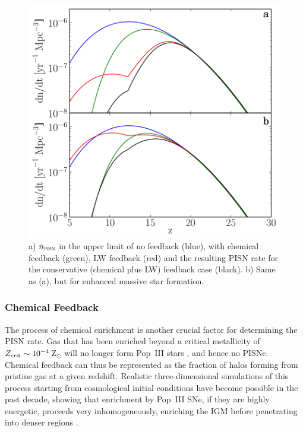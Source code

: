 \documentclass{thesis}
\newcommand{\zsun}{\ensuremath{\,\mathrm{Z}_{\odot}}\xspace}
\begin{document}
\begin{figure}
 \begin{center}
   \includegraphics[width=\columnwidth]{feedbackRate}
   \caption{a) $\dot{n}_{\textsc{pisn}}$ in the upper limit of no
     feedback (blue), with chemical feedback (green), LW feedback
     (red) and the resulting PISN rate for the conservative (chemical
     plus LW) feedback case (black).  b) Same as (a), but for enhanced
     massive star formation.}
   \label{fbrate}
 \end{center}
\end{figure}


\subsubsection{Chemical Feedback}
The process of chemical enrichment is another crucial factor for
determining the PISN rate.  Gas that has been enriched beyond a
critical metallicity of $Z_{\rm crit} \sim 10^{-4}$\zsun will
no longer form Pop~III stars \citep{BrommKudritzkiLoeb2001,
  Schneideretal2002, BrommLoeb2003}, and hence no PISNe.  Chemical
feedback can thus be represented as the fraction of halos forming from
pristine gas at a given redshift.  Realistic three-dimensional
simulations of this process starting from cosmological initial
conditions have become possible in the past decade, showing that
enrichment by Pop~III SNe, if they are highly energetic, proceeds very
inhomogeneously, enriching the IGM before penetrating into denser
regions \citep{Scannapiecoetal2005, Greifetal2007,
  TornatoreFerraraSchneider2007,WiseAbel2008, Maioetal2010}.
\end{document}
